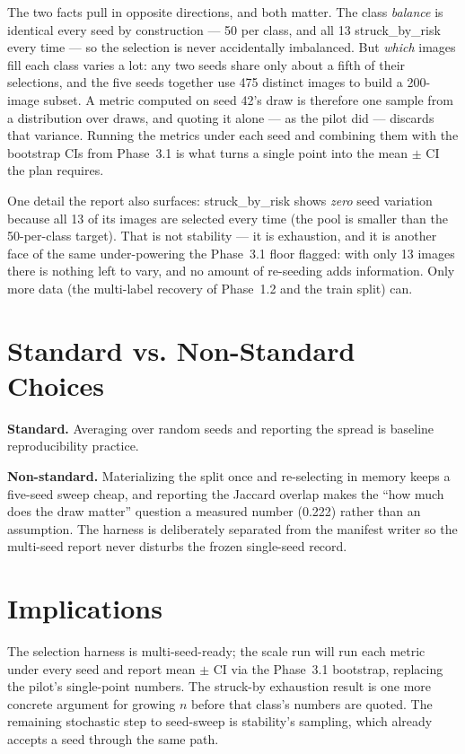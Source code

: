 The two facts pull in opposite directions, and both matter. The class \emph{balance} is identical every
seed by construction --- 50 per class, and all 13 struck\_by\_risk every time --- so the selection is
never accidentally imbalanced. But \emph{which} images fill each class varies a lot: any two seeds share
only about a fifth of their selections, and the five seeds together use 475 distinct images to build a
200-image subset. A metric computed on seed 42's draw is therefore one sample from a distribution over
draws, and quoting it alone --- as the pilot did --- discards that variance. Running the metrics under
each seed and combining them with the bootstrap CIs from Phase~3.1 is what turns a single point into the
mean $\pm$ CI the plan requires.

One detail the report also surfaces: struck\_by\_risk shows \emph{zero} seed variation because all 13 of
its images are selected every time (the pool is smaller than the 50-per-class target). That is not
stability --- it is exhaustion, and it is another face of the same under-powering the Phase~3.1 floor
flagged: with only 13 images there is nothing left to vary, and no amount of re-seeding adds
information. Only more data (the multi-label recovery of Phase~1.2 and the train split) can.

\section{Standard vs. Non-Standard Choices}

\textbf{Standard.} Averaging over random seeds and reporting the spread is baseline reproducibility
practice.

\textbf{Non-standard.} Materializing the split once and re-selecting in memory keeps a five-seed sweep
cheap, and reporting the Jaccard overlap makes the ``how much does the draw matter'' question a measured
number (0.222) rather than an assumption. The harness is deliberately separated from the manifest writer
so the multi-seed report never disturbs the frozen single-seed record.

\section{Implications}

The selection harness is multi-seed-ready; the scale run will run each metric under every seed and report
mean $\pm$ CI via the Phase~3.1 bootstrap, replacing the pilot's single-point numbers. The struck-by
exhaustion result is one more concrete argument for growing $n$ before that class's numbers are quoted.
The remaining stochastic step to seed-sweep is stability's sampling, which already accepts a seed through
the same path.
